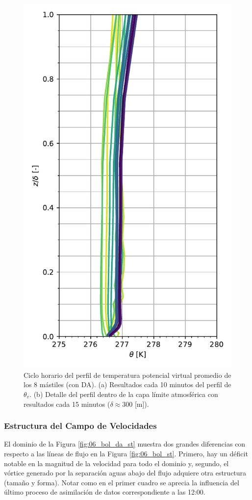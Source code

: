 \begin{figure}[H]
	\begin{minipage}{0.5\linewidth}
		\centering
		\includegraphics[width=0.9\linewidth,trim={0cm 5mm 0cm 0cm},clip]{Imagenes/06/bol_da/mean_profile}%
	\end{minipage}%
	
	\caption{Ciclo horario del perfil de temperatura potencial virtual promedio de los 8 mástiles (con DA). (a) Resultados cada 10 minutos del perfil de $\theta_v$. (b) Detalle del perfil dentro de la capa límite atmosférica con resultados cada 15 minutos ($\delta\approx300$ [m]).}
	\label{fig:06_bol_da_pbl}
\end{figure}
\subsubsection{Estructura del Campo de Velocidades}
El dominio de la Figura \ref{fig:06_bol_da_st} muestra dos grandes diferencias con respecto a las líneas de flujo en la Figura \ref{fig:06_bol_st}. Primero, hay un déficit notable en la magnitud de la velocidad para todo el dominio y, segundo, el vórtice generado por la separación aguas abajo del flujo adquiere otra estructura (tamaño y forma). Notar como en el primer cuadro se aprecia la influencia del último proceso de asimilación de datos correspondiente a las 12:00.

